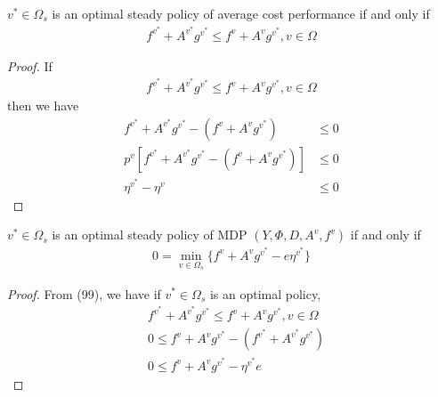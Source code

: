\documentclass[runningheads]{llncs}
\begin{document}
    \begin{theorem}
        $v^* \in \Omega_s$ is an optimal steady policy of average cost performance if and only if
        \begin{align}
            f^{v^*} + A^{v^*} g^{v^*} \leq f^v + A^v g^{v^*}, v \in \Omega
        \end{align}
    \end{theorem}
    \begin{proof}
        If
        \begin{align}
            f^{v^*} + A^{v^*} g^{v^*} \leq f^v + A^v g^{v^*}, v \in \Omega
        \end{align}
        then we have
        \begin{align}
            f^{v^*} + A^{v^*} g^{v^*} - (f^v + A^v g^{v^*}) &\leq 0 \\
            p^v[f^{v^*} + A^{v^*} g^{v^*} - (f^v + A^v g^{v^*})] &\leq 0 \\
            \eta^{v^*} - \eta^v &\leq 0
        \end{align}
    \end{proof}
    \begin{theorem}
        $v^* \in \Omega_s$ is an optimal steady policy of
         MDP $(Y, \Phi, D, A^v, f^v)$ if and only if
         \begin{align}
             0 = \mathop{\min}_{v \in \Omega_s} \{ f^v + A^v g^{v^*} - e\eta^{v^*} \}
         \end{align}
    \end{theorem}
    \begin{proof}
        From (99), we have if $v^* \in \Omega_s$ is an optimal policy,
        \begin{align}
            &f^{v^*} + A^{v^*} g^{v^*} \leq f^v + A^v g^{v^*}, v \in \Omega \\
            &0 \leq f^v + A^v g^{v^*} - (f^{v^*} + A^{v^*} g^{v^*}) \\
            &0 \leq f^v + A^v g^{v^*} - \eta^{v^*} e
        \end{align}
    \end{proof}
\end{document}
